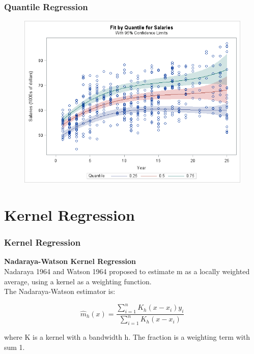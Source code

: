 \documentclass{beamer}
\begin{document}
\begin{frame}
	\frametitle{Quantile Regression}
	\large
	\begin{figure}
\centering
\includegraphics[width=0.7\linewidth]{images/quantregbin3}
\caption{}
\label{fig:quantregbin3}
\end{figure}

\end{frame}
\section{Kernel Regression}
\begin{frame}
\frametitle{Kernel Regression}
\large\noindent \textbf{Nadaraya-Watson Kernel Regression}\\
	Nadaraya 1964 and Watson 1964 proposed to estimate m as a locally weighted average, using a kernel as a weighting function.\\ The Nadaraya-Watson estimator is:
	
	\[\widehat{m}_h(x)=\frac{\sum_{i=1}^n K_h(x-x_i) y_i}{\sum_{i=1}^nK_h(x-x_i)}  \]
	
	where K is a kernel with a bandwidth h. The fraction is a weighting term with sum 1.
\end{frame}

\end{document}
